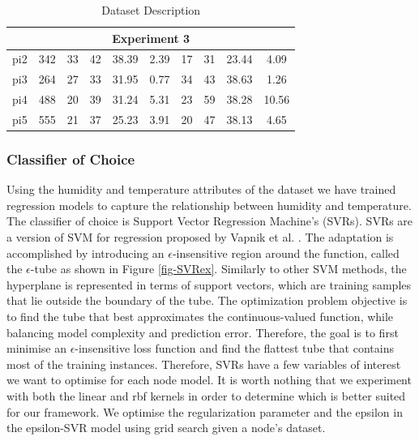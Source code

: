 \documentclass{mprop}
\begin{document}
\begin{table}[]
\begin{tabular}{|cccccccccc|}
\multicolumn{10}{|c|}{\textbf{Experiment 3}}                                                                                                                                   \\ \hline
\multicolumn{1}{|c|}{pi2}           & \multicolumn{1}{c|}{342}                     & 33  & 42  & 38.39 & \multicolumn{1}{c|}{2.39} & 17      & 31      & 23.44     & 4.09      \\
\multicolumn{1}{|c|}{pi3}           & \multicolumn{1}{c|}{264}                     & 27  & 33  & 31.95 & \multicolumn{1}{c|}{0.77} & 34      & 43      & 38.63     & 1.26      \\
\multicolumn{1}{|c|}{pi4}           & \multicolumn{1}{c|}{488}                     & 20  & 39  & 31.24 & \multicolumn{1}{c|}{5.31} & 23      & 59      & 38.28     & 10.56     \\
\multicolumn{1}{|c|}{pi5}           & \multicolumn{1}{c|}{555}                     & 21  & 37  & 25.23 & \multicolumn{1}{c|}{3.91} & 20      & 47      & 38.13     & 4.65      \\ \hline
\end{tabular}
\caption{\label{tab:Data Description}Dataset Description}
\end{table}

\subsubsection{Classifier of Choice}

Using the humidity and temperature attributes of the dataset we have trained regression models to capture the relationship between humidity and temperature. The classifier of choice is Support Vector Regression Machine's (SVRs). SVRs are a version of SVM for regression proposed by Vapnik et al. \cite{OriginalSVR}. The adaptation is accomplished by introducing an $\epsilon$-insensitive region around the function, called the $\epsilon$-tube as shown in Figure \ref{fig-SVRex}. Similarly to other SVM methods, the hyperplane is represented in terms of support vectors, which are training samples that lie outside the boundary of the tube.  The optimization problem objective is to find the tube that best approximates the continuous-valued function, while balancing model complexity and prediction error. Therefore, the goal is to first minimise an $\epsilon$-insensitive loss function and find the flattest tube that contains most of the training instances. Therefore, SVRs have a few variables of interest we want to optimise for each node model. It is worth nothing that we experiment with both the linear and rbf kernels in order to determine which is better suited for our framework. We optimise the regularization parameter and the epsilon in the epsilon-SVR model using grid search given a node's dataset.
\end{document}
